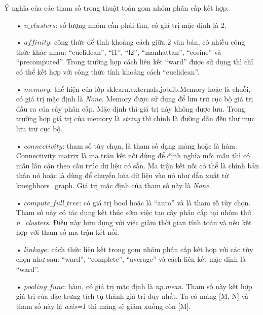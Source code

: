 Ý nghĩa của các tham số trong thuật toán gom nhóm phân cấp kết hợp:
\begin{enumerate}
\item[•]$n{\_}clusters$: số lượng nhóm cần phải tìm, có giá trị mặc định là 2.
\item[•]$affinity$: công thức để tính khoảng cách giữa 2 văn bản, có nhiều công thức khác nhau: ``euclidean'', ``l1'', ``l2'', ``manhattan'', ``cosine'' và ``precomputed''.
Trong trường hợp cách liên kết ``ward'' được sử dụng thì chỉ có thể kết hợp với công thức tính khoảng cách ``euclidean''.
\item[•]$memory$: thể hiện của lớp sklearn.externals.joblib.Memory hoặc là chuỗi, có giá trị mặc định là \textit{None}.
Memory được sử dụng để lưu trữ cục bộ giá trị đầu ra của cây phân cấp.
Mặc định thì giá trị này không được lưu.
Trong trường hợp giá trị của memory là \textit{string} thì chính là đường dẫn đến thư mục lưu trữ cục bộ.
\item[•]$connectivity$: tham số tùy chọn, là tham số dạng mảng hoặc là hàm.
Connectivity matrix là ma trận kết nối dùng để định nghĩa mỗi mẫu thì có mẫu lân cận theo cấu trúc dữ liệu có sẵn.
Ma trận kết nối có thể là chính bản thân nó hoặc là dùng để chuyển hóa dữ liệu vào nó như dẫn xuất từ kneighbors{\_}graph.
Giá trị mặc định của tham số này là \textit{None}.
\item[•]$compute{\_}full{\_}tree$: có giá trị bool hoặc là ``auto'' và là tham số tùy chọn.
Tham số này có tác dụng kết thúc sớm việc tạo cây phân cấp tại nhóm thứ \textit{n{\_}clusters}.
Điều này hữu dụng với việc giảm thời gian tính toán và nếu kết hợp với tham số ma trận kết nối.
\item[•]$linkage$: cách thức liên kết trong gom nhóm phân cấp kết hợp với các tùy chọn như sau: {``ward'', ``complete'', ``average''} và cách liên kết mặc định là ``ward''.
\item[•]$pooling{\_}func$: hàm, có giá trị mặc định là \textit{np.mean}.
Tham số này kết hợp giá trị của đặc trưng tích tụ thành giá trị duy nhất.
Ta có mảng [M, N] và tham số này là \textit{axis=1} thì mảng sẽ giảm xuống còn [M].
\end{enumerate}

